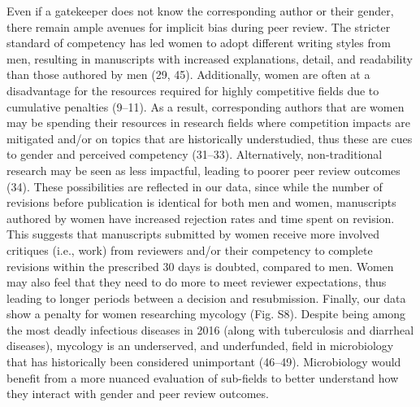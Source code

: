 \documentclass[11pt,]{article}
\begin{document}
Even if a gatekeeper does not know the corresponding author or their
gender, there remain ample avenues for implicit bias during peer review.
The stricter standard of competency has led women to adopt different
writing styles from men, resulting in manuscripts with increased
explanations, detail, and readability than those authored by men (29,
45). Additionally, women are often at a disadvantage for the resources
required for highly competitive fields due to cumulative penalties
(9--11). As a result, corresponding authors that are women may be
spending their resources in research fields where competition impacts
are mitigated and/or on topics that are historically understudied, thus
these are cues to gender and perceived competency (31--33).
Alternatively, non-traditional research may be seen as less impactful,
leading to poorer peer review outcomes (34). These possibilities are
reflected in our data, since while the number of revisions before
publication is identical for both men and women, manuscripts authored by
women have increased rejection rates and time spent on revision. This
suggests that manuscripts submitted by women receive more involved
critiques (i.e., work) from reviewers and/or their competency to
complete revisions within the prescribed 30 days is doubted, compared to
men. Women may also feel that they need to do more to meet reviewer
expectations, thus leading to longer periods between a decision and
resubmission. Finally, our data show a penalty for women researching
mycology (Fig. S8). Despite being among the most deadly infectious
diseases in 2016 (along with tuberculosis and diarrheal diseases),
mycology is an underserved, and underfunded, field in microbiology that
has historically been considered unimportant (46--49). Microbiology
would benefit from a more nuanced evaluation of sub-fields to better
understand how they interact with gender and peer review outcomes.
\end{document}
